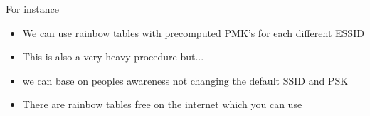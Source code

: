 \documentclass{beamer}
\begin{document}
\begin{frame}{For instance}
 \begin{itemize}
 \pause \item We can use rainbow tables with precomputed PMK's for each different ESSID
\pause \item This is also a very heavy procedure but...
\pause \item we can base on peoples awareness not changing the default SSID and PSK
\pause \item There are rainbow tables free on the internet which you can use
 \end{itemize}
\end{frame}
\end{document}
